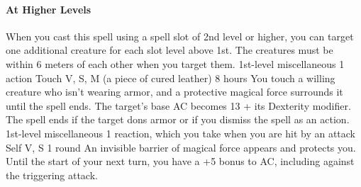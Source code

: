         \paragraph{At Higher Levels}
        When you cast this spell using a spell slot of 2nd level or higher, you can target one additional creature for each slot level above 1st.
        The creatures must be within 6 meters of each other when you target them.
        {1st-level miscellaneous}
        {1 action}
        {Touch}
        {V, S, M (a piece of cured leather)}
        {8 hours}
        You touch a willing creature who isn't wearing armor, and a protective magical force surrounds it until the spell ends.
        The target's base AC becomes 13 + its Dexterity modifier.
        The spell ends if the target dons armor or if you dismiss the spell as an action.
        {1st-level miscellaneous}
        {1 reaction, which you take when you are hit by an attack}
        {Self}
        {V, S}
        {1 round}
        An invisible barrier of magical force appears and protects you.
        Until the start of your next turn, you have a +5 bonus to AC, including against the triggering attack.
